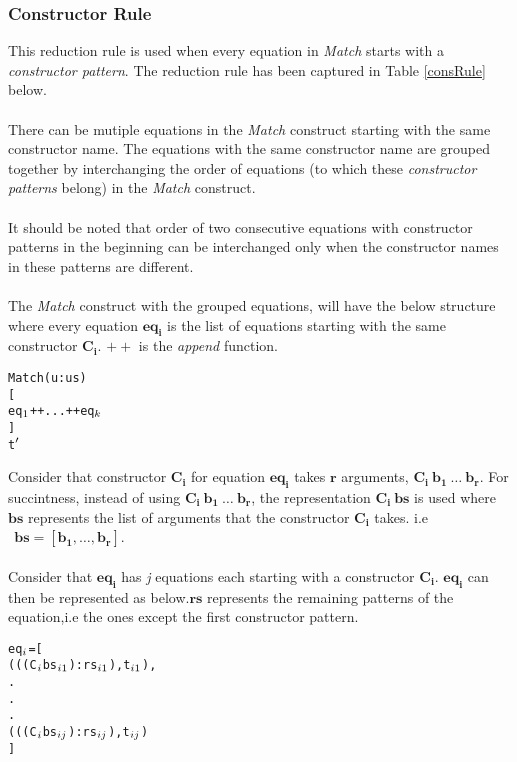\documentclass[11pt]{article}
\begin{document}
\subsubsection {Constructor Rule}
This reduction rule is used when every equation in {\em Match} starts with a {\em constructor pattern}. The reduction rule has been captured in Table \ref {consRule} below. 
~~\\~~\\
There can be mutiple equations in the {\em Match}
construct starting with the same constructor name. The equations with the same constructor name are grouped together by interchanging the order of equations (to which these {\em constructor patterns} belong) in the {\em Match} construct.
~~\\~~\\
It should be noted that order of two consecutive equations with constructor patterns in the beginning can be interchanged only when the constructor names in these patterns are different.
~~\\ ~~\\  
The {\em Match} construct with the grouped equations, will have the below structure where every equation $\mathbf {eq_i}$ is the list of equations starting with the same constructor $\mathbf {C_i}$. $\mathbf {++}$ is the {\em append} function.
\begin{alltt}

            Match (u:us) 
                     [
                       eq\(\sb{1}\) ++ ... ++ eq\(\sb{k}\) 
                     ]
                     t\(\sp{\prime}\)  


\end{alltt}
Consider that constructor $\mathbf {C_i}$ for equation $\mathbf {eq_i}$ takes $\mathbf {r}$ arguments, $\mathbf {C_i~b_1~\ldots~b_r}$. For succintness, instead of using $\mathbf {C_i~b_1~\ldots~b_r}$, the representation $\mathbf{C_i~bs}$ is used where $\mathbf{bs}$ represents the list of arguments that the constructor $\mathbf{C_i}$ takes.
i.e $\mathbf {~~bs = [b_1,\ldots,b_r]} .$
~~\\~~\\
Consider that $\mathbf {eq_i}$ has {\em j} equations each starting with a constructor $\mathbf {C_i}$. $\mathbf {eq_i}$ can then be represented as 
below.$\mathbf {rs}$ represents the remaining patterns of the equation,i.e the ones except the first constructor pattern.   
\begin{alltt}

           eq\(\sb{i}\) = [
                    ( ((C\(\sb{i}\) bs\(\sb{i1}\)):rs\(\sb{i1}\)),t\(\sb{i1}\)),
                          .
                          .
                          .
                    ( ((C\(\sb{i}\) bs\(\sb{ij}\)):rs\(\sb{ij}\)),t\(\sb{ij}\))
                  ]  

\end{alltt}
\end{document}
